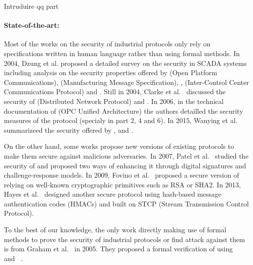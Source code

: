 \TODO Intruduire \opcua qq part


\paragraph{State-of-the-art:}\label{sec:intro_sota}

Most of the works on the security of industrial protocols only rely on
specifications written in human language rather than using formal methods.
In 2004, Dzung et al. proposed a detailed survey on the security in SCADA
systems including analysis on the security properties offered by \opc (Open
Platform Communications), \mms (Manufacturing Message Specification),
, \iccp (Inter-Control Center Communications Protocol) and \etherip.
Still in 2004, Clarke et al.~\cite{CR04} discussed the security of \dnp
(Distributed Network Protocol) and \iccp.
In 2006, in the technical documentation of \opcua (OPC Unified Architecture) the
authors detailled the security measures of the protocol (specialy in part 2, 4
and 6).
In 2015, Wanying et al. summarizeed the security offered by \modbus, \dnp and
\opcua.

On the other hand, some works propose new versions of existing protocols to make
them secure against malicious adversaries.
In 2007, Patel et al.~\cite{PY07} studied the security of \dnp and proposed two
ways of enhancing it through digital signatures and challenge-response models.
In 2009, Fovino et al.~\cite{FCMT09} proposed a secure version of \modbus
relying on well-known cryptographic primitives such as RSA or SHA2.
In 2013, Hayes et al.~\cite{HE13} designed another secure \modbus protocol using
hash-based message authentication codes (HMACs) and built on STCP (Stream
Transmission Control Protocol).

To the best of our knowledge, the only work directly making use of formal
methods to prove the security of industrial protocols or find attack against
them is from Graham et al.~\cite{GP05} in 2005.
They proposed a formal verification of \dnp using \ofmc~\cite{BMV03} and
\spear~\cite{SH01}.

